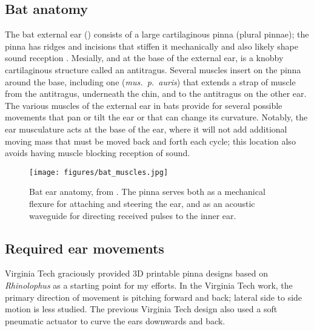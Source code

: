 \documentclass{article}
\begin{document}
\subsection{Bat anatomy}
The bat external ear () consists of a large cartilaginous pinna (plural pinnae); the pinna has ridges and incisions that stiffen it mechanically and also likely shape sound reception \citep{heine2004anatomy, pannala2013investigation, pannala2013interplay, schouten2019principles}. Mesially, and at the base of the external ear, is a knobby cartilaginous structure called an antitragus. Several muscles insert on the pinna around the base, including one (\emph{mus.~p.~auris}) that extends a strap of muscle from the antitragus, underneath the chin, and to the antitragus on the other ear. The various muscles of the external ear in bats provide for several possible movements that pan or tilt the ear or that can change its curvature. Notably, the ear musculature acts at the base of the ear, where it will not add additional moving mass that must be moved back and forth each cycle; this location also avoids having muscle blocking reception of sound. 
\begin{figure}[h]
\begin{center}
\texttt{[image: figures/bat\_muscles.jpg]}
\end{center}
\caption{Bat ear anatomy, from \citep{pannala2013investigation}. The pinna serves both as a mechanical flexure for attaching and steering the ear, and as an acoustic waveguide for directing received pulses to the inner ear.}
\label{fig:1}
\end{figure}

\subsection{Required ear movements}
Virginia Tech graciously provided 3D printable pinna designs based on \emph{Rhinolophus} as a starting point for my efforts. In the Virginia Tech work, the primary direction of movement is pitching forward and back; lateral side to side motion is less studied. The previous Virginia Tech design also used a soft pneumatic actuator to curve the ears downwards and back.%
\end{document}
